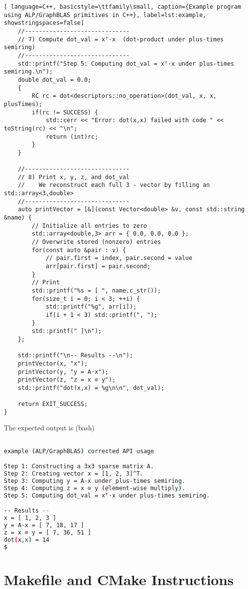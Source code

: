 \begin{lstlisting}[ language=C++, basicstyle=\ttfamily\small, caption={Example program using ALP/GraphBLAS primitives in C++}, label=lst:example, showstringspaces=false]
    //------------------------------
    // 7) Compute dot_val = xᵀ·x  (dot‐product under plus‐times semiring)
    //------------------------------
    std::printf("Step 5: Computing dot_val = xᵀ·x under plus‐times semiring.\n");
    double dot_val = 0.0;
    {
        RC rc = dot<descriptors::no_operation>(dot_val, x, x, plusTimes);
        if(rc != SUCCESS) {
            std::cerr << "Error: dot(x,x) failed with code " << toString(rc) << "\n";
            return (int)rc;
        }
    }

    //------------------------------
    // 8) Print x, y, z, and dot_val
    //    We reconstruct each full 3 - vector by filling an std::array<3,double>
    //------------------------------
    auto printVector = [&](const Vector<double> &v, const std::string &name) {
        // Initialize all entries to zero
        std::array<double,3> arr = { 0.0, 0.0, 0.0 };
        // Overwrite stored (nonzero) entries
        for(const auto &pair : v) {
            // pair.first = index, pair.second = value
            arr[pair.first] = pair.second;
        }
        // Print
        std::printf("%s = [ ", name.c_str());
        for(size_t i = 0; i < 3; ++i) {
            std::printf("%g", arr[i]);
            if(i + 1 < 3) std::printf(", ");
        }
        std::printf(" ]\n");
    };

    std::printf("\n-- Results --\n");
    printVector(x, "x");
    printVector(y, "y = A·x");
    printVector(z, "z = x ⊙ y");
    std::printf("dot(x,x) = %g\n\n", dot_val);

    return EXIT_SUCCESS;
}
\end{lstlisting}

The expected output is (bash)

\begin{lstlisting}[language=bash]

example (ALP/GraphBLAS) corrected API usage

Step 1: Constructing a 3x3 sparse matrix A.
Step 2: Creating vector x = [1, 2, 3]^T.
Step 3: Computing y = A·x under plus‐times semiring.
Step 4: Computing z = x ⊙ y (element‐wise multiply).
Step 5: Computing dot_val = xᵀ·x under plus‐times semiring.

-- Results --
x = [ 1, 2, 3 ]
y = A·x = [ 7, 18, 17 ]
z = x ⊙ y = [ 7, 36, 51 ]
dot(x,x) = 14
$
\end{lstlisting}



\section{Makefile and CMake Instructions}\label{sec:build_instructions}

